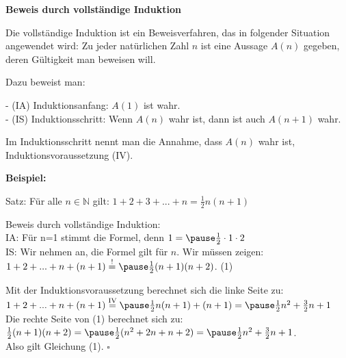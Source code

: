\begin{frame}[fragile]

\textbf{Beweis durch vollständige Induktion}

 Die vollständige Induktion ist ein Beweisverfahren, das in folgender Situation angewendet wird: 
 Zu jeder natürlichen Zahl $n$ ist eine Aussage
$A(n)$ gegeben, deren Gültigkeit man beweisen will. \pause

Dazu beweist man:

- (IA) Induktionsanfang: $A(1)$ ist wahr. \\ \pause
- (IS) Induktionsschritt: Wenn $A(n)$ wahr ist, dann ist auch $A(n+1)$ wahr. \pause

Im Induktionsschritt nennt man die Annahme, dass $A(n)$ wahr ist, Induktionsvoraussetzung (IV).

\end{frame}

\begin{frame}[fragile]

\textbf{Beispiel:}

Satz: Für alle $n \in \mathbb{N}$ gilt: $1+2+3+...+n = \frac{1}{2}n(n+1)$

Beweis durch vollständige Induktion: \\
IA: \pause Für n=1 stimmt die Formel, denn \pause $1 = \pause \frac{1}{2}\cdot 1 \cdot 2$ \\ \pause
IS: \pause Wir nehmen an, die Formel gilt für $n$. Wir müssen zeigen: \pause \\
$1 + 2 + ... + n + (n+1)  \overset{!}{=} \pause \frac{1}{2}(n+1)(n+2)$.  \quad \quad (1) \\ \pause

Mit der Induktionsvoraussetzung berechnet sich die linke Seite zu: \\
$1 + 2 + ... + n + (n+1)  \overset{\text{IV}}{=}  \pause \frac{1}{2}n(n+1) + (n+1) = \pause \frac{1}{2}n^2 + \frac{3}{2}n +1$ \\ \pause
Die rechte Seite von (1) berechnet sich zu: \\
 $\frac{1}{2}(n+1)(n+2) = \pause \frac{1}{2}(n^2+2n+n+2) = \pause \frac{1}{2}n^2+ \frac{3}{2}n+1$. \\ \pause
Also gilt Gleichung (1).  \hfill $\square$


\end{frame}




